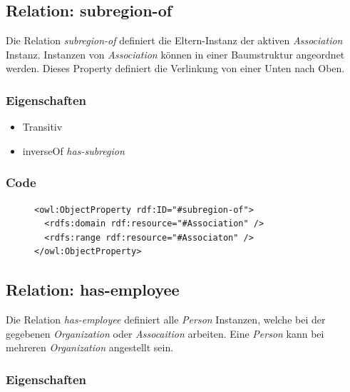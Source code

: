 \documentclass[
    11pt,
    latin1,
    a4paper,
    oneside
]{scrreprt}
\begin{document}
\subsection{Relation: subregion-of} \label{sec:rel_subregionof}

Die Relation \emph{subregion-of} definiert die Eltern-Instanz der aktiven \emph{Association} Instanz. Instanzen von \emph{Association} k\"onnen in einer Baumstruktur angeordnet werden. Dieses Property definiert die Verlinkung von einer Unten nach Oben.

\subsubsection{Eigenschaften} \label{sec:rel_subregionof_settings}

\begin{itemize}
  \item Transitiv
  \item inverseOf \emph{has-subregion}
\end{itemize}

\subsubsection{Code} \label{sec:rel_subregionof_code}

\begin{figure}[H]
 \lstset{language=XML}
 \begin{lstlisting}[label=owl:subregionof,caption={Die Relation \emph{subregion-of} definiert die \"ubergeordnete \emph{Association}}]
<owl:ObjectProperty rdf:ID="#subregion-of">
  <rdfs:domain rdf:resource="#Association" />
  <rdfs:range rdf:resource="#Associaton" />
</owl:ObjectProperty>
 \end{lstlisting}
\end{figure}


\subsection{Relation: has-employee} \label{sec:rel_hasemployee}

Die Relation \emph{has-employee} definiert alle \emph{Person} Instanzen, welche bei der gegebenen \emph{Organization} oder \emph{Assocaition} arbeiten. Eine \emph{Person} kann bei mehreren \emph{Organization} angestellt sein.

\subsubsection{Eigenschaften} \label{sec:rel_hasemployee_settings}
\end{document}
